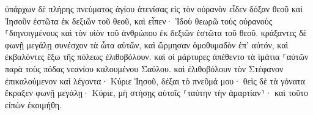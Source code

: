 \documentclass{openreader}
\begin{document}
ὑπάρχων δὲ πλήρης πνεύματος ἁγίου ἀτενίσας εἰς τὸν οὐρανὸν εἶδεν δόξαν θεοῦ καὶ Ἰησοῦν ἑστῶτα ἐκ δεξιῶν τοῦ θεοῦ, 
καὶ εἶπεν· Ἰδοὺ θεωρῶ τοὺς οὐρανοὺς ⸀διηνοιγμένους καὶ τὸν υἱὸν τοῦ ἀνθρώπου ἐκ δεξιῶν ἑστῶτα τοῦ θεοῦ. 
κράξαντες δὲ φωνῇ μεγάλῃ συνέσχον τὰ ὦτα αὐτῶν, καὶ ὥρμησαν ὁμοθυμαδὸν ἐπ’ αὐτόν, 
καὶ ἐκβαλόντες ἔξω τῆς πόλεως ἐλιθοβόλουν. καὶ οἱ μάρτυρες ἀπέθεντο τὰ ἱμάτια ⸀αὐτῶν παρὰ τοὺς πόδας νεανίου καλουμένου Σαύλου. 
καὶ ἐλιθοβόλουν τὸν Στέφανον ἐπικαλούμενον καὶ λέγοντα· Κύριε Ἰησοῦ, δέξαι τὸ πνεῦμά μου· 
θεὶς δὲ τὰ γόνατα ἔκραξεν φωνῇ μεγάλῃ· Κύριε, μὴ στήσῃς αὐτοῖς ⸂ταύτην τὴν ἁμαρτίαν⸃· καὶ τοῦτο εἰπὼν ἐκοιμήθη. 
\end{document}
